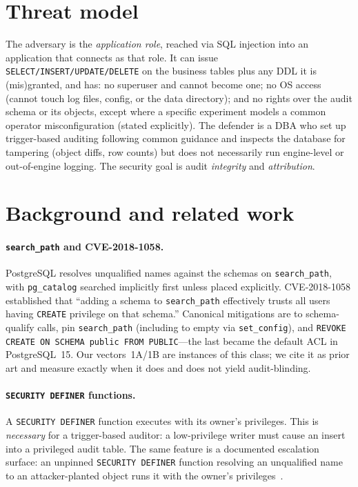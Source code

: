 \documentclass[11pt]{article}
\newcommand{\code}[1]{\texttt{#1}}
\begin{document}
\section{Threat model}
The adversary is the \emph{application role}, reached via SQL injection into an application
that connects as that role. It can issue \code{SELECT/INSERT/UPDATE/DELETE} on the business
tables plus any DDL it is (mis)granted, and has: no superuser and cannot become one; no OS
access (cannot touch log files, config, or the data directory); and no rights over the
audit schema or its objects, except where a specific experiment models a common operator
misconfiguration (stated explicitly). The defender is a DBA who set up trigger-based
auditing following common guidance and inspects the database for tampering (object diffs,
row counts) but does not necessarily run engine-level or out-of-engine logging. The
security goal is audit \emph{integrity} and \emph{attribution}.

\section{Background and related work}
\paragraph{\code{search\_path} and CVE-2018-1058.}
PostgreSQL resolves unqualified names against the schemas on \code{search\_path}, with
\code{pg\_catalog} searched implicitly first unless placed explicitly. CVE-2018-1058
\cite{pgsec2018,pgcommit2018,pgwiki2018} established that ``adding a schema to
\code{search\_path} effectively trusts all users having \code{CREATE} privilege on that
schema.'' Canonical mitigations are to schema-qualify calls, pin \code{search\_path}
(including to empty via \code{set\_config}), and \code{REVOKE CREATE ON SCHEMA public FROM
PUBLIC}---the last became the default ACL in PostgreSQL~15. Our vectors~1A/1B are instances
of this class; we cite it as prior art and measure exactly when it does and does not yield
audit-blinding.

\paragraph{\code{SECURITY DEFINER} functions.}
A \code{SECURITY DEFINER} function executes with its owner's privileges. This is
\emph{necessary} for a trigger-based auditor: a low-privilege writer must cause an insert
into a privileged audit table. The same feature is a documented escalation surface: an
unpinned \code{SECURITY DEFINER} function resolving an unqualified name to an
attacker-planted object runs it with the owner's privileges~\cite{cybertec,pgcommit2018}.
\end{document}
